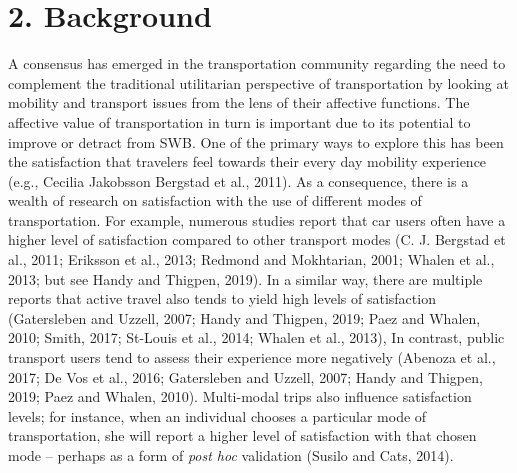 \documentclass[]{elsarticle} %
\begin{document}
\hypertarget{background}{%
\section{2. Background}\label{background}}

A consensus has emerged in the transportation community regarding the
need to complement the traditional utilitarian perspective of
transportation by looking at mobility and transport issues from the lens
of their affective functions. The affective value of transportation in
turn is important due to its potential to improve or detract from SWB.
One of the primary ways to explore this has been the satisfaction that
travelers feel towards their every day mobility experience (e.g.,
Cecilia Jakobsson Bergstad et al., 2011). As a consequence, there is a
wealth of research on satisfaction with the use of different modes of
transportation. For example, numerous studies report that car users
often have a higher level of satisfaction compared to other transport
modes (C. J. Bergstad et al., 2011; Eriksson et al., 2013; Redmond and
Mokhtarian, 2001; Whalen et al., 2013; but see Handy and Thigpen, 2019).
In a similar way, there are multiple reports that active travel also
tends to yield high levels of satisfaction (Gatersleben and Uzzell,
2007; Handy and Thigpen, 2019; Paez and Whalen, 2010; Smith, 2017;
St-Louis et al., 2014; Whalen et al., 2013), In contrast, public
transport users tend to assess their experience more negatively (Abenoza
et al., 2017; De Vos et al., 2016; Gatersleben and Uzzell, 2007; Handy
and Thigpen, 2019; Paez and Whalen, 2010). Multi-modal trips also
influence satisfaction levels; for instance, when an individual chooses
a particular mode of transportation, she will report a higher level of
satisfaction with that chosen mode -- perhaps as a form of \emph{post
hoc} validation (Susilo and Cats, 2014).
\end{document}
